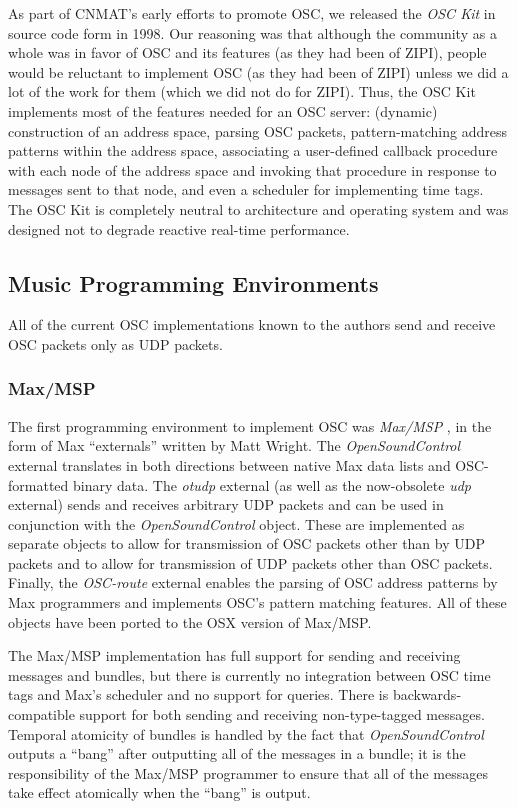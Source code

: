 As part of CNMAT's early efforts to promote OSC, we released the \textit{OSC
Kit} \cite{Wright:1998a} in source code form in 1998.  Our reasoning was that although the
community as a whole was in favor of OSC and its features (as they had been of
ZIPI), people would be reluctant to implement OSC (as they had been of ZIPI)
unless we did a lot of the work for them (which we did not do for ZIPI). Thus,
the OSC Kit implements most of the features needed for an OSC server: (dynamic)
construction of an address space,  parsing OSC packets, pattern-matching address
patterns within the address space, associating a user-defined callback procedure
with each node of the address space and invoking that procedure in response to
messages sent to that node, and even a scheduler for implementing time tags.  The
OSC Kit is completely neutral to architecture and operating system and was
designed not to degrade reactive real-time performance.

\subsection{Music Programming Environments}

All of the current OSC implementations known to the authors send and receive OSC
packets only as UDP packets.

\subsubsection{Max/MSP}

The first programming environment to implement OSC was \textit{Max/MSP} \cite{Puckette:1991,Zicarelli:1998}, in the form of Max ``externals'' written by Matt Wright. The
\textit{OpenSoundControl} external translates in both directions between native
Max data lists and OSC-formatted binary data.  The \textit{otudp} external (as
well as the now-obsolete \textit{udp} external) sends and receives arbitrary UDP
packets and can be used in conjunction with the \textit{OpenSoundControl} object.
 These are implemented as separate objects to allow for transmission of OSC
packets other than by UDP packets and to allow for transmission of UDP packets
other than OSC packets.  Finally, the \textit{OSC-route} external enables the
parsing of OSC address patterns by Max programmers and implements OSC's pattern
matching features. All of these objects have been ported to the OSX version of
Max/MSP.

The Max/MSP implementation has full support for sending and receiving messages
and bundles, but there is currently no integration between OSC time tags and
Max's scheduler and no support for queries.  There is backwards-compatible
support for both sending and receiving non-type-tagged messages.  Temporal
atomicity of bundles is handled by the fact that \textit{OpenSoundControl}
outputs a ``bang'' after outputting all of the messages in a bundle; it is the
responsibility of the Max/MSP programmer to ensure that all of the messages take
effect atomically when the ``bang'' is output.

